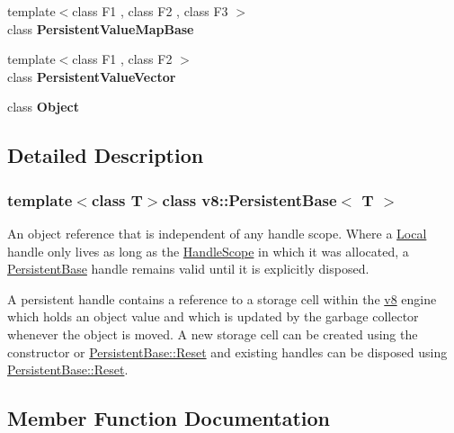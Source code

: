 \begin{DoxyCompactItemize}
\item 
\hypertarget{classv8_1_1_persistent_base_a08e2b8f164392d71811ce6cc134f33e3}{}{\footnotesize template$<$class F1 , class F2 , class F3 $>$ }\\class {\bfseries Persistent\+Value\+Map\+Base}\label{classv8_1_1_persistent_base_a08e2b8f164392d71811ce6cc134f33e3}

\item 
\hypertarget{classv8_1_1_persistent_base_a978bb1377559897d74d5fe883a54a315}{}{\footnotesize template$<$class F1 , class F2 $>$ }\\class {\bfseries Persistent\+Value\+Vector}\label{classv8_1_1_persistent_base_a978bb1377559897d74d5fe883a54a315}

\item 
\hypertarget{classv8_1_1_persistent_base_a0720b5f434e636e22a3ed34f847eec57}{}class {\bfseries Object}\label{classv8_1_1_persistent_base_a0720b5f434e636e22a3ed34f847eec57}

\end{DoxyCompactItemize}


\subsection{Detailed Description}
\subsubsection*{template$<$class T$>$class v8\+::\+Persistent\+Base$<$ T $>$}

An object reference that is independent of any handle scope. Where a \hyperlink{classv8_1_1_local}{Local} handle only lives as long as the \hyperlink{classv8_1_1_handle_scope}{Handle\+Scope} in which it was allocated, a \hyperlink{classv8_1_1_persistent_base}{Persistent\+Base} handle remains valid until it is explicitly disposed.

A persistent handle contains a reference to a storage cell within the \hyperlink{namespacev8}{v8} engine which holds an object value and which is updated by the garbage collector whenever the object is moved. A new storage cell can be created using the constructor or \hyperlink{classv8_1_1_persistent_base_a174bb1e45b18fd4eeaee033622825bb8}{Persistent\+Base\+::\+Reset} and existing handles can be disposed using \hyperlink{classv8_1_1_persistent_base_a174bb1e45b18fd4eeaee033622825bb8}{Persistent\+Base\+::\+Reset}. 

\subsection{Member Function Documentation}
\hypertarget{classv8_1_1_persistent_base_a4a64c26d91ed6a276aa8a7ca4bb7683a}{}
